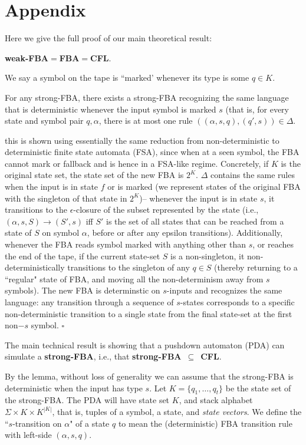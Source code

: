 \documentclass[11pt]{article}
\begin{document}
\section{Appendix}
Here we give the full proof of our main theoretical result:

\medskip{} {\bf weak-FBA}$=${\bf FBA}$=${\bf CFL}.

\medskip{} We say a symbol on the tape is ``marked' whenever its type is some $q \in K$.

\medskip{} For any strong-FBA, there exists a strong-FBA recognizing the same language that is deterministic whenever the input symbol is marked $s$ (that is, for every state and symbol pair $q,\alpha$, there is at most one rule $((\alpha,s,q),(q',s)) \in \Delta$.

\medskip{} this is shown using essentially the same reduction from non-deterministic to deterministic finite state automata (FSA), since when at a seen symbol, the FBA cannot mark or fallback and is hence in a FSA-like regime. Concretely, if $K$ is the original state set, the state set of the new FBA is $2^K$. $\Delta$ contains the same rules when the input is in state $f$ or is marked (we represent states of the original FBA with the singleton of that state in $2^K$)-- whenever the input is in state $s$, it transitions to the $\epsilon$-closure of the subset represented by the state (i.e., $(\alpha,s,S)\rightarrow (S',s)$ iff $S'$ is the set of all states that can be reached from a state of $S$ on symbol $\alpha$, before or after any epsilon transitions). Additionally, whenever the FBA reads symbol marked with anything other than $s$, or reaches the end of the tape, if the current state-set $S$ is a non-singleton, it non-deterministically transitions to the singleton of any $q \in S$ (thereby returning to a ``regular" state of FBA, and moving all the non-determinism away from $s$ symbols). The new FBA is determinstic on $s$-inputs and recognizes the same language: any transition through a sequence of $s$-states corresponds to a specific non-deterministic transition to a single state from the final state-set at the first non$-s$ symbol. $\square$

The main technical result is showing that a pushdown automaton (PDA) can simulate a {\bf strong-FBA}, i.e., that {\bf strong-FBA}~$\subseteq$~{\bf CFL}. 

\medskip{} By the lemma, without loss of generality we can assume that the strong-FBA is deterministic when the input has type $s$. Let $K=\{q_1,\ldots,q_t\}$ be the state set of the strong-FBA. The PDA will have state set $K$, and stack alphabet $\Sigma \times K \times K^{|K|}$, that is, tuples of a symbol, a state, and {\em state vectors}. We define the ``$s$-transition on $\alpha$" of a state $q$ to mean the (deterministic) FBA transition rule with left-side $(\alpha,s,q)$.
\end{document}
